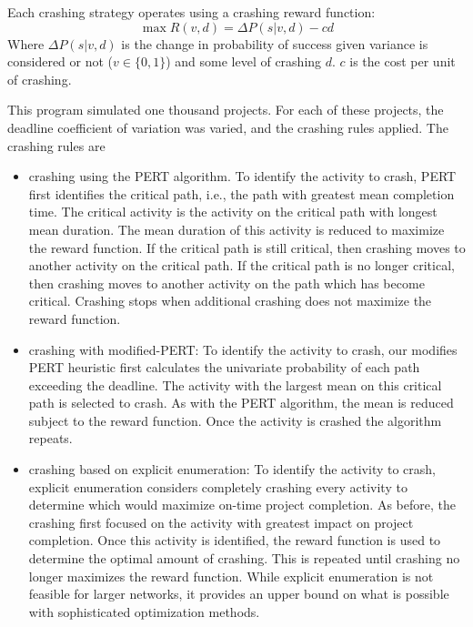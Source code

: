 \documentclass[11pt]{article}
\begin{document}
Each crashing strategy operates using a crashing reward function: $$\max R(v,d) = \Delta P(s|v,d) - c d$$ Where $\Delta P(s|v,d)$ is the change in probability of success given variance is considered or not ($v \in \{0,1\}$) and some level of crashing $d$. $c$ is the cost per unit of crashing.  

This program simulated one thousand projects. For each of these projects, the deadline coefficient of variation was varied, and the crashing rules applied. The crashing rules are
\begin{itemize}
\item crashing using the PERT algorithm. To identify the  activity to crash, PERT first identifies the critical path, i.e., the path with greatest mean completion time. The critical activity is the activity on the critical path with longest mean duration. The mean duration of this activity is reduced to maximize the reward function. If the critical path is still critical, then crashing moves to another activity on the critical path.  If the critical path is no longer critical, then crashing moves to another activity on the path which has become critical.  Crashing stops when additional crashing does not maximize the reward function. 
\item crashing with modified-PERT: To identify the activity to crash, our modifies PERT heuristic first calculates the univariate probability of each path exceeding the deadline. The activity with the largest mean on this critical path is selected to crash. As with the PERT algorithm, the mean is reduced subject to the reward function. Once the activity is crashed the algorithm repeats.   
\item crashing based on explicit enumeration: To identify the activity to crash, explicit enumeration considers completely crashing every activity to determine which would maximize on-time project completion. As before, the crashing first focused on the activity with greatest impact on project completion. Once this activity is identified, the reward function is used to determine the optimal amount of crashing. This is repeated until crashing no longer maximizes the reward function. While explicit enumeration is not feasible for larger networks, it provides an upper bound on what is possible with sophisticated optimization methods.
\end{itemize}
\end{document}
